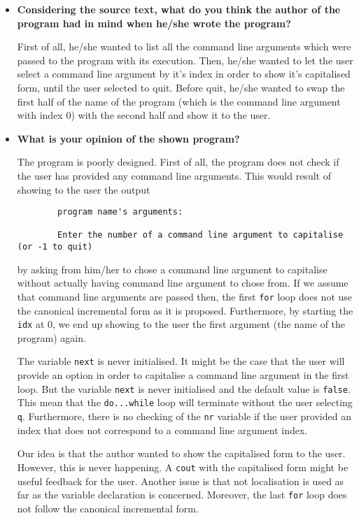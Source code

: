 \documentclass[a4paper]{article}
\newcounter{exerciseCount}
\newcommand{\exercise}[1]{\addtocounter{exerciseCount}{1} \noindent \medskip {\large \textsf{\textbf{Exercise \arabic{exerciseCount} #1}}} \par}
\begin{document}
\exercise{} %

\begin{itemize}
	\item \textbf{Considering the source text, what do you think the author of the program had in mind when he/she wrote the program?}
	
	First of all, he/she wanted to list all the command line arguments which were passed to the program with its execution. Then, he/she wanted to let the user select a command line argument by it's index in order to show it's capitalised form, until the user selected to quit. Before quit, he/she wanted to swap the first half of the name of the program (which is the command line argument with index 0) with the second half and show it to the user.
	
	\item \textbf{What is your opinion of the shown program?}
	
	The program is poorly designed. First of all, the program does not check if the user has provided any command line arguments. This would result of showing to the user the output
	
	\begin{verbatim}
		program name's arguments:
		
		Enter the number of a command line argument to capitalise (or -1 to quit)
	\end{verbatim}
	
	by asking from him/her to chose a command line argument to capitalise without actually having command line argument to chose from. If we assume that command line arguments are passed then, the first \verb|for| loop does not use the canonical incremental form as it is proposed. Furthermore, by starting the \verb|idx| at 0, we end up showing to the user the first argument (the name of the program) again.
	
	The variable \verb|next| is never initialised. It might be the case that the user will provide an option in order to capitalise a command line argument in the first loop. But the variable \verb|next| is never initialised and the default value is \verb|false|. This mean that the \verb|do...while| loop will terminate without the user selecting \verb|q|. Furthermore, there is no checking of the \verb|nr| variable if the user provided an index that does not correspond to a command line argument index.
	
	Our idea is that the author wanted to show the capitalised form to the user. However, this is never happening. A \verb|cout| with the capitalised form might be useful feedback for the user. Another issue is that not localisation is used as far as the variable declaration is concerned. Moreover, the last \verb|for| loop does not follow the canonical incremental form.
\end{itemize}
\end{document}
